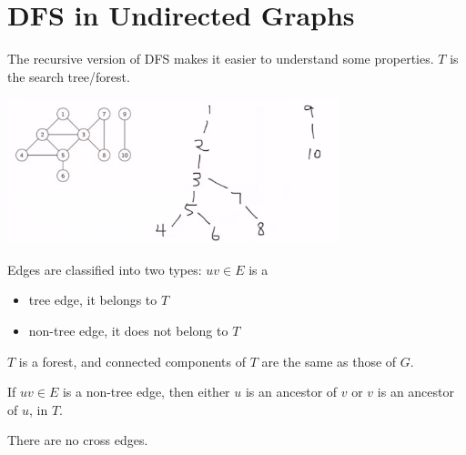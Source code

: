 
\section{DFS in Undirected Graphs}
\begin{itemize}
    \item The recursive version of DFS makes it easier to understand some properties. $T$ is the search tree/forest.
    \begin{center}
        \item[] \includegraphics[width=0.725\textwidth]{lecture17/images/undirected-dfs-tree.jpg}
    \end{center}
    \item[] 
    \item Edges are classified into two types: $uv \in E$ is a
    \begin{itemize}
        \item tree edge, it belongs to $T$
        \item non-tree edge, it does not belong to $T$
    \end{itemize}
    \item $T$ is a forest, and connected components of $T$ are the same as those of $G$.
    \item If $uv \in E$ is a non-tree edge, then either $u$ is an ancestor of $v$ or $v$ is an ancestor of $u$, in $T$.
    \item There are no cross edges.
\end{itemize}

